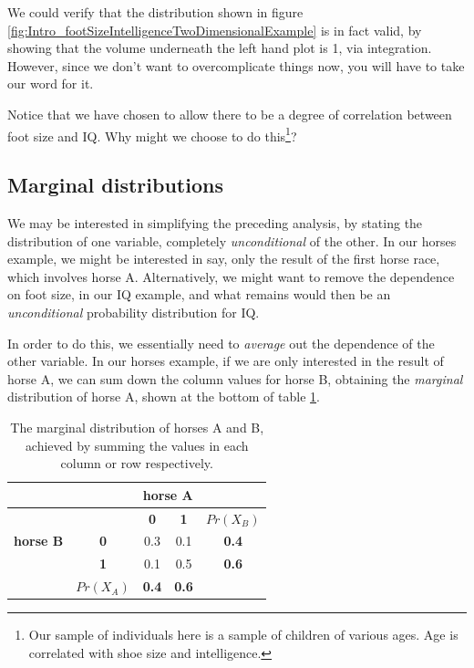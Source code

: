 \documentclass[11pt,fullpage]{book}
\begin{document}
We could verify that the distribution shown in figure \ref{fig:Intro_footSizeIntelligenceTwoDimensionalExample} is in fact valid, by showing that the volume underneath the left hand plot is 1, via integration. However, since we don't want to overcomplicate things now, you will have to take our word for it.

Notice that we have chosen to allow there to be a degree of correlation between foot size and IQ. Why might we choose to do this\footnote{Our sample of individuals here is a sample of children of various ages. Age is correlated with shoe size and intelligence.}?

\subsection{Marginal distributions}\label{sec:Intro_marginal}
We may be interested in simplifying the preceding analysis, by stating the distribution of one variable, completely \textit{unconditional} of the other. In our horses example, we might be interested in say, only the result of the first horse race, which involves horse A. Alternatively, we might want to remove the dependence on foot size, in our IQ example, and what remains would then be an \textit{unconditional} probability distribution for IQ.

In order to do this, we essentially need to \textit{average} out the dependence of the other variable. In our horses example, if we are only interested in the result of horse A, we can sum down the column values for horse B, obtaining the \textit{marginal} distribution of horse A, shown at the bottom of table \ref{tab:Intro_coinsMarginal}.


\begin{table}[htbp]
  \centering
    \begin{tabular}{rrccr}
    \toprule
          &       & \multicolumn{2}{c}{\textbf{horse A}} &  \\
    \midrule
          &       & \textbf{0} & \textbf{1} & \multicolumn{1}{c}{\textbf{$Pr(X_B)$}} \\
    \multicolumn{1}{c}{\textbf{horse B}} & \multicolumn{1}{c}{\textbf{0}} & 0.3   & 0.1   & \multicolumn{1}{c}{\textbf{0.4}} \\
    \multicolumn{1}{c}{} & \multicolumn{1}{c}{\textbf{1}} & 0.1   & 0.5   & \multicolumn{1}{c}{\textbf{0.6}} \\
          & \multicolumn{1}{c}{\textbf{$Pr(X_A)$}} & \textbf{0.4} & \textbf{0.6} & \multicolumn{1}{c}{} \\
    \bottomrule
    \end{tabular}%
  \caption{The marginal distribution of horses A and B, achieved by summing the values in each column or row respectively.}\label{tab:Intro_coinsMarginal}%
\end{table}%
\end{document}
